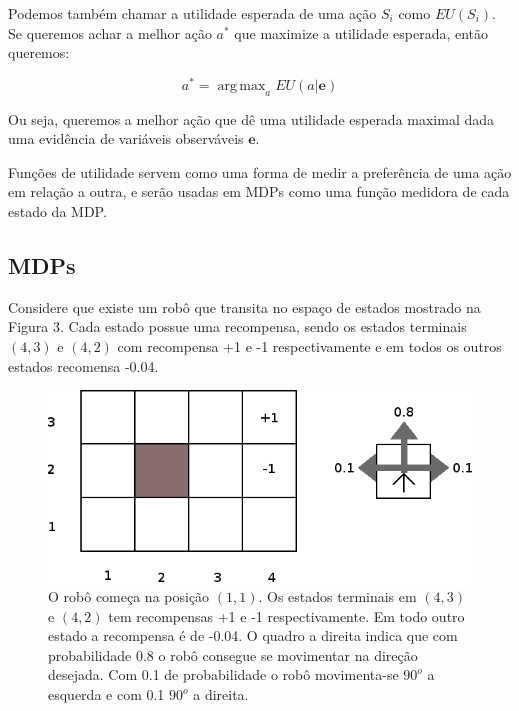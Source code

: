 \documentclass[a4paper,10pt]{article}
\DeclareMathOperator*{\argmax}{arg\,max}
\theoremstyle{plain}
\begin{document}
Podemos também chamar a utilidade esperada de uma ação $S_i$ como $EU(S_i)$. Se queremos achar a
melhor ação $a^*$ que maximize a utilidade esperada, então queremos:

\begin{equation*}
  a^* = \argmax_a EU(a|\mathbf{e})
\end{equation*}

Ou seja, queremos a melhor ação que dê uma utilidade esperada maximal dada uma evidência de
variáveis observáveis $\mathbf{e}$.

Funções de utilidade servem como uma forma de medir a preferência de uma ação em relação a outra,
e serão usadas em MDPs como uma função medidora de cada estado da MDP.

\newpage

\subsection{MDPs}

Considere que existe um robô que transita no espaço de estados mostrado na Figura 3. Cada estado
possue uma recompensa, sendo os estados terminais $(4, 3)$ e $(4, 2)$ com recompensa +1 e -1
respectivamente e em todos os outros estados recomensa -0.04.

\begin{figure}[h]
  \begin{center}
    \includegraphics[scale=0.4]{imgs/grid4x3.png}
  \end{center}
  \caption{O robô começa na posição $(1, 1)$. Os estados terminais em $(4, 3)$ e $(4, 2)$ tem
  recompensas +1 e -1 respectivamente. Em todo outro estado a recompensa é de -0.04. O quadro a
  direita indica que com probabilidade 0.8 o robô consegue se movimentar na direção desejada. Com
  0.1 de probabilidade o robô movimenta-se $90^o$ a esquerda e com 0.1 $90^o$ a direita.}
\end{figure}
\end{document}
